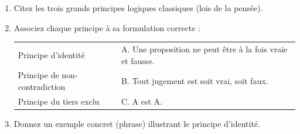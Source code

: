 \documentclass[11pt]{article}
\begin{document}
\begin{exercice}
\begin{enumerate}
    \item Citez les trois grands principes logiques classiques (lois de la pensée).
    \item Associez chaque principe à sa formulation correcte :
    \begin{tabular}{ll}
        Principe d'identité & A. Une proposition ne peut être à la fois vraie et fausse. \\
        Principe de non-contradiction & B. Tout jugement est soit vrai, soit faux. \\
        Principe du tiers exclu & C. A est A.
    \end{tabular}
    \item Donnez un exemple concret (phrase) illustrant le principe d'identité.
\end{enumerate}
\end{exercice}
\end{document}
